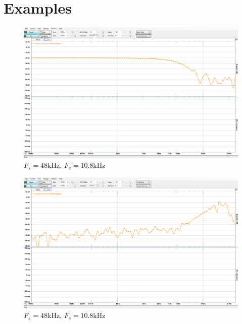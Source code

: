 \documentclass[12pt,a4paper,titlepage]{article}
\begin{document}
\newpage

\section{Examples}
\begin{figure}[!htb]
  \centering
  \includegraphics[width=\textwidth]
                  {../presentation/lowpass-final.png}
                  \caption{$F_s = 48$kHz, $F_c = 10.8$kHz}
                  \label{fig:c0}
\end{figure}
\begin{figure}[!htb]
  \centering
  \includegraphics[width=\textwidth]
                  {../presentation/highpass-final.png}
                  \caption{$F_s = 48$kHz, $F_c = 10.8$kHz}
                  \label{fig:c1}
\end{figure}
\end{document}
